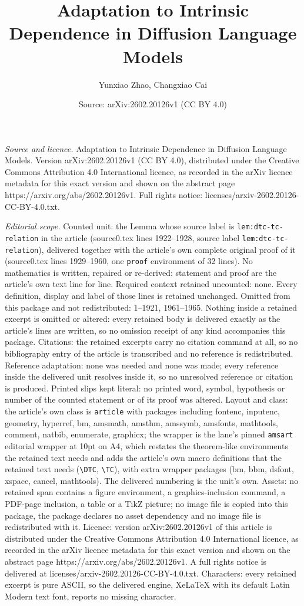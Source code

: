 \documentclass[10pt,a4paper]{amsart}
\title[Adaptation to Intrinsic Dependence in Diffusion Language Mod]{Adaptation to Intrinsic Dependence in Diffusion Language Models}
\author{Yunxiao Zhao, Changxiao Cai}
\date{Source: arXiv:2602.20126v1 (CC BY 4.0)}
\begin{document}
\maketitle

\noindent\emph{Source and licence.} Adaptation to Intrinsic Dependence in Diffusion Language Models. Version arXiv:2602.20126v1 (CC BY 4.0), distributed under the Creative Commons Attribution 4.0 International licence, as recorded in the arXiv licence metadata for this exact version and shown on the abstract page https://arxiv.org/abs/2602.20126v1. Full rights notice: licenses/arxiv-2602.20126-CC-BY-4.0.txt.\par\smallskip

\noindent\textit{Editorial scope.} Counted unit: the Lemma whose source label is \texttt{lem:dtc-tc-relation} in the article (source0.tex lines 1922--1928, source label \texttt{lem:dtc-tc-relation}), delivered together with the article's own complete original proof of it (source0.tex lines 1929--1960, one \texttt{proof} environment of 32 lines). No mathematics is written, repaired or re-derived: statement and proof are the article's own text line for line. Required context retained uncounted: none. Every definition, display and label of those lines is retained unchanged. Omitted from this package and not redistributed: 1--1921, 1961--1965. Nothing inside a retained excerpt is omitted or altered: every retained body is delivered exactly as the article's lines are written, so no omission receipt of any kind accompanies this package. Citations: the retained excerpts carry no citation command at all, so no bibliography entry of the article is transcribed and no reference is redistributed. Reference adaptation: none was needed and none was made; every reference inside the delivered unit resolves inside it, so no unresolved reference or citation is produced. Printed slips kept literal: no printed word, symbol, hypothesis or number of the counted statement or of its proof was altered. Layout and class: the article's own class is \texttt{article} with packages including fontenc, inputenc, geometry, hyperref, bm, amsmath, amsthm, amssymb, amsfonts, mathtools, comment, natbib, enumerate, graphicx; the wrapper is the lane's pinned \texttt{amsart} editorial wrapper at 10pt on A4, which restates the theorem-like environments the retained text needs and adds the article's own macro definitions that the retained text needs (\texttt{\textbackslash DTC}, \texttt{\textbackslash TC}), with extra wrapper packages (bm, bbm, dsfont, xspace, cancel, mathtools). The delivered numbering is the unit's own. Assets: no retained span contains a figure environment, a graphics-inclusion command, a PDF-page inclusion, a table or a TikZ picture; no image file is copied into this package, the package declares no asset dependency and no image file is redistributed with it. Licence: version arXiv:2602.20126v1 of this article is distributed under the Creative Commons Attribution 4.0 International licence, as recorded in the arXiv licence metadata for this exact version and shown on the abstract page https://arxiv.org/abs/2602.20126v1. A full rights notice is delivered at licenses/arxiv-2602.20126-CC-BY-4.0.txt. Characters: every retained excerpt is pure ASCII, so the delivered engine, XeLaTeX with its default Latin Modern text font, reports no missing character.
\end{document}
